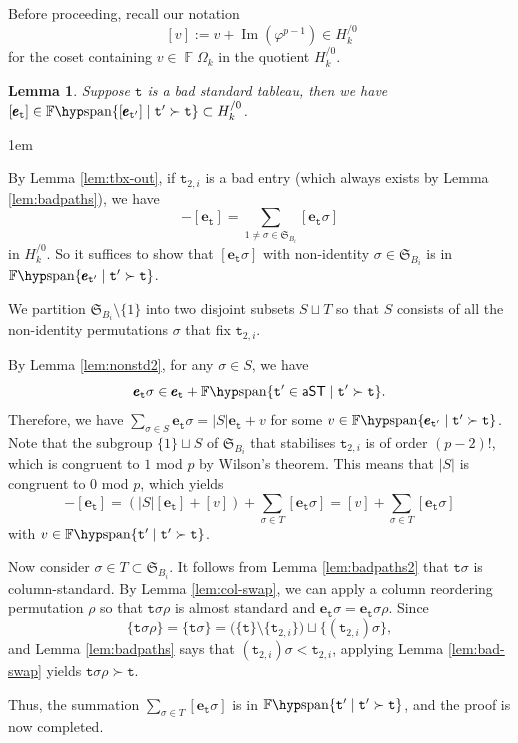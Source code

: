 \documentclass[a4paper]{amsart}
\makeatletter
\numberwithin{equation}{subsection}
\newtheorem{lemma}[theorem]{Lemma}
\theoremstyle{definition}
\DeclareMathOperator{\F}{\mathbb{F}}
\DeclareMathOperator{\Image}{\mathrm{Im}}
\newcommand{\bfe}{\pmb{e}}
\newcommand{\tbx}{\mathtt{t}}
\newcommand{\aST}{\mathsf{aST}}
\newcommand{\Fspan}{\mathbb{F}\hyp\mathrm{span}}
\renewenvironment{proof}[1][\proofname]{\par
	\pushQED{\qed}%
	\normalfont \topsep0\p@\@plus6\p@ \labelsep1em\relax
	\trivlist
	\item[\hskip\labelsep\bfseries #1]\ignorespaces
	\mbox{}%
}{
	\popQED\endtrivlist\@endpefalse
}
\numberwithin{equation}{subsection}
\makeatother
\begin{document}
Before proceeding, recall our notation 
\[\ [v]:=v+\Image(\varphi^{p-1}) \in H_k^{/0}\]
for the coset containing $v\in \F\Omega_k$ in the quotient $H_k^{/0}$.

\begin{lemma}\label{lem:badstd}
Suppose $\tbx$ is a bad standard tableau, then we have $[\bfe_{\tbx}] \in \Fspan\{[\bfe_{\tbx'}]\mid \tbx'\succ\tbx\}\subset H_k^{/0}$.
\end{lemma}
\begin{proof}
By Lemma \ref{lem:tbx-out}, if $\tbx_{2,i}$ is a bad entry (which always exists by Lemma \ref{lem:badpaths}), we have 
\[
-[\bfe_\tbx]=\sum_{1\neq \sigma\in \mathfrak{S}_{B_i}} [\bfe_{\tbx}\sigma]
\]
in $H_k^{/0}$.
So it suffices to show that $[\bfe_\tbx\sigma]$ with non-identity $\sigma\in \mathfrak{S}_{B_i}$ is in $\Fspan\{\bfe_{\tbx'}\mid \tbx'\succ\tbx\}$.

We partition $\mathfrak{S}_{B_i}\setminus\{1\}$ into two disjoint subsets $S\sqcup T$ so that $S$ consists of all the non-identity permutations $\sigma$ that fix $\tbx_{2,i}$.

By Lemma \ref{lem:nonstd2}, for any $\sigma\in S$, we have
\[
\bfe_{\tbx}\sigma \in \bfe_{\tbx} + \Fspan\{ \tbx' \in \aST \mid \tbx'\succ \tbx \}.
\]
Therefore, we have $\sum_{\sigma\in S} \bfe_\tbx \sigma = |S|\bfe_\tbx + v$ for some $v\in \Fspan\{\bfe_{\tbx'}\mid \tbx'\succ\tbx\}$.
Note that the subgroup $\{1\}\sqcup S$ of $\mathfrak{S}_{B_i}$ that stabilises $\tbx_{2,i}$ is of order $(p-2)!$, which is congruent to $1$ mod $p$ by Wilson's theorem.
This means that $|S|$ is congruent to $0$ mod $p$, which yields
\[
-[\bfe_\tbx] = (|S|[\bfe_\tbx]+[v])+\sum_{\sigma \in T}[\bfe_{\tbx}\sigma] =  [v]+\sum_{\sigma \in T}[\bfe_{\tbx}\sigma]
\]
with $v\in \Fspan\{\tbx'\mid \tbx'\succ\tbx\}$.

Now consider $\sigma\in T\subset \mathfrak{S}_{B_i}$.  
It follows from Lemma \ref{lem:badpaths2} that $\tbx\sigma$ is column-standard.
By Lemma \ref{lem:col-swap}, we can apply a column reordering permutation $\rho$ so that $\tbx\sigma\rho$ is almost standard and $\bfe_\tbx\sigma=\bfe_\tbx\sigma\rho$.
Since
\[
\{\tbx \sigma\rho\}=\{\tbx\sigma\} = \big(\{\tbx\}\setminus\{\tbx_{2,i}\}\big)\sqcup\{(\tbx_{2,i})\sigma\},
\]
and Lemma \ref{lem:badpaths} says that $(\tbx_{2,i})\sigma< \tbx_{2,i}$, applying Lemma \ref{lem:bad-swap} yields $\tbx\sigma\rho\succ \tbx$.

Thus, the summation $\sum_{\sigma\in T}[\bfe_\tbx\sigma]$ is in $\Fspan\{\tbx'\mid \tbx'\succ\tbx\}$, and the proof is now completed.
\end{proof}
\end{document}
